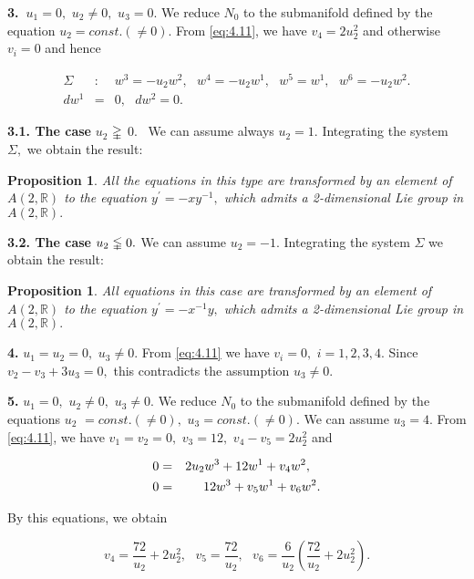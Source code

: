 \documentclass{amsproc}
\newtheorem{proposition}[theorem]{Proposition}
\theoremstyle{remark}
\numberwithin{equation}{section}
\begin{document}
\textbf{3.\ }$u_{1}=0,$ $u_{2}\neq 0,$ $u_{3}=0.$ We reduce $N_{0}$ to the
submanifold defined by the equation $u_{2}=const.(\neq 0).$ From \eqref{eq:4.11},
we have $v_{4}=2u_{2}^{2}$ and otherwise $v_{i}=0$ and hence

\begin{eqnarray*}
\Sigma &:&w^{3}=-u_{2}w^{2},\text{ }w^{4}=-u_{2}w^{1},\text{ }w^{5}=w^{1},\text{ }w^{6}=-u_{2}w^{2}. \\
dw^{1} &=&0,\text{ }dw^{2}=0.
\end{eqnarray*}

\textbf{3.1. The case }$u_{2}$ $\gvertneqq $ $0$. \ We can assume always $u_{2}=1.$ Integrating the system $\Sigma ,$ we obtain the result:

\begin{proposition}
All the equations in this type are transformed by an element of $A(2,\mathbb{R}
)$ to the equation $y^{\prime }=-xy^{-1},$ which admits a 2-dimensional Lie
group in $A(2,\mathbb{R}
).$
\end{proposition}

\textbf{3.2. The case }$u_{2}\lvertneqq 0.$ We can assume $u_{2}=-1.$
Integrating the system $\Sigma $ we obtain the result:

\begin{proposition}
All equations in this case are transformed by an element of $A(2,\mathbb{R}
)$ to the equation $y^{\prime }=-x^{-1}y,$ which admits a 2-dimensional Lie
group in $A(2,\mathbb{R}
).$
\end{proposition}

\textbf{4. }$u_{1}=u_{2}=0,$ $u_{3}\neq 0.$ From \eqref{eq:4.11} we have $v_{i}=0,$
$i=1,2,3,4.$ Since $v_{2}-v_{3}+3u_{3}=0,$ this contradicts the assumption $u_{3}\neq 0.$

\textbf{5. }$u_{1}=0,$ $u_{2}\neq 0,$ $u_{3}\neq 0.$ We reduce $N_{0}$ to
the submanifold defined by the equations $u_{2}$ $=const.(\neq 0),$ $u_{3}=const.(\neq 0).$ We can assume $u_{3}=4.$ From \eqref{eq:4.11}, we have $v_{1}=v_{2}=0,$ $v_{3}=12,$ $v_{4}-v_{5}=2u_{2}^{2}$ and

\begin{eqnarray}
0 &=&2u_{2}w^{3}+12w^{1}+v_{4}w^{2},
 \label{eq:4.12}
  \text{\ \ } \\
0 &=&12w^{3}+v_{5}w^{1}+v_{6}w^{2}. \notag
\end{eqnarray}

By this equations, we obtain

\begin{equation*}
v_{4}=\frac{72}{u_{2}}+2u_{2}^{2},\text{ \ }v_{5}=\frac{72}{u_{2}},\text{ \ }v_{6}=\frac{6}{u_{2}}(\frac{72}{u_{2}}+2u_{2}^{2}).
\end{equation*}
\end{document}
